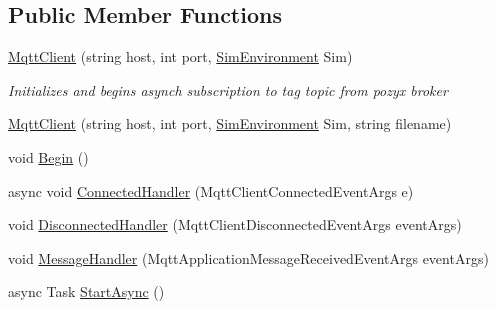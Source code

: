\subsection*{Public Member Functions}
\begin{DoxyCompactItemize}
\item 
\hyperlink{class_pozyx_subscriber_1_1_framework_1_1_mqtt_client_ad2d247e2046c2a43f823e77a94802545}{Mqtt\+Client} (string host, int port, \hyperlink{class_pozyx_subscriber_1_1_sim_environment}{Sim\+Environment} Sim)
\begin{DoxyCompactList}\small\item\em Initializes and begins asynch subscription to tag topic from pozyx broker \end{DoxyCompactList}\item 
\hyperlink{class_pozyx_subscriber_1_1_framework_1_1_mqtt_client_aeeb12e63278f50106a6d5fb6605d2f0b}{Mqtt\+Client} (string host, int port, \hyperlink{class_pozyx_subscriber_1_1_sim_environment}{Sim\+Environment} Sim, string filename)
\item 
void \hyperlink{class_pozyx_subscriber_1_1_framework_1_1_mqtt_client_aab2a4adc47c58e9de1e307d0c8f467dc}{Begin} ()
\item 
async void \hyperlink{class_pozyx_subscriber_1_1_framework_1_1_mqtt_client_a88bca5e01f7b0aa1279d0b92cff3b03b}{Connected\+Handler} (Mqtt\+Client\+Connected\+Event\+Args e)
\item 
void \hyperlink{class_pozyx_subscriber_1_1_framework_1_1_mqtt_client_acabf34348d05e247155adf10d7632b6f}{Disconnected\+Handler} (Mqtt\+Client\+Disconnected\+Event\+Args event\+Args)
\item 
void \hyperlink{class_pozyx_subscriber_1_1_framework_1_1_mqtt_client_a5ee71b80d7ae09ef3a487a5762094b7e}{Message\+Handler} (Mqtt\+Application\+Message\+Received\+Event\+Args event\+Args)
\item 
async Task \hyperlink{class_pozyx_subscriber_1_1_framework_1_1_mqtt_client_a0fc53bbaeb9efec6fa5d8ad5708e3fae}{Start\+Async} ()
\end{DoxyCompactItemize}
